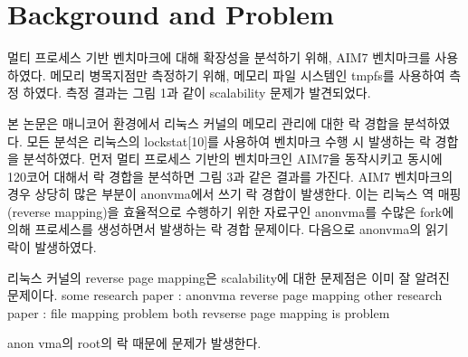 \section{Background and Problem}


\ifkor
멀티 프로세스 기반 벤치마크에 대해 확장성을 분석하기 위해, AIM7 벤치마크를 사용하였다. 
메모리 병목지점만 측정하기 위해, 메모리 파일 시스템인 tmpfs를 사용하여 측정 하였다. 
측정 결과는 그림 1과 같이 scalability 문제가 발견되었다. 
\else
\fi





\ifkor
본 논문은 매니코어 환경에서 리눅스 커널의 메모리 관리에 대한 락 경합을 분석하였다. 
모든 분석은 리눅스의 lockstat[10]를 사용하여 벤치마크 수행 시 발생하는 락 경합을 분석하였다.
먼저 멀티 프로세스 기반의 벤치마크인 AIM7을 동작시키고 동시에 120코어 대해서 락 경합을 분석하면 
그림 3과 같은 결과를 가진다. 
AIM7 벤치마크의 경우 상당히 많은 부분이 anonvma에서 쓰기 락 경합이 발생한다. 
이는 리눅스 역 매핑(reverse mapping)을 효율적으로 수행하기 위한 자료구인 anonvma를 
수많은 fork에 의해 프로세스를 생성하면서 발생하는 락 경합 문제이다. 
다음으로 anonvma의 읽기 락이 발생하였다.
\else
\fi



\ifkor
리눅스 커널의 reverse page mapping은 scalability에 대한 문제점은 이미 잘 알려진 문제이다.
some research paper : anonvma reverse page mapping
other research paper : file mapping problem
both revserse page mapping is problem 
\else
\fi





\ifkor
anon vma의 root의 락 때문에 문제가 발생한다.
\else
\fi




